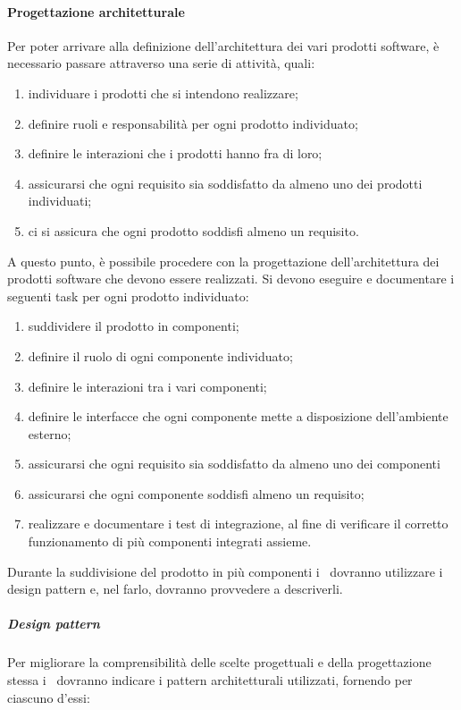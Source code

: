 \documentclass[../NormeProgetto.tex]{subfiles}
\begin{document}
		\paragraph{Progettazione architetturale}
			Per poter arrivare alla definizione dell'architettura dei vari prodotti software, è necessario passare attraverso una serie di attività, quali:
			\begin{enumerate}
				\item individuare i prodotti che si intendono realizzare;
				\item definire ruoli e responsabilità per ogni prodotto individuato;
				\item definire le interazioni che i prodotti hanno fra di loro;
				\item assicurarsi che ogni requisito sia soddisfatto da almeno uno dei prodotti individuati;
				\item ci si assicura che ogni prodotto soddisfi almeno un requisito.
			\end{enumerate}
			A questo punto, è possibile procedere con la progettazione dell'architettura dei prodotti software che devono essere realizzati. Si devono eseguire e documentare i seguenti task per ogni prodotto individuato:
			\begin{enumerate}
				\item suddividere il prodotto in componenti;
				\item definire il ruolo di ogni componente individuato;
				\item definire le interazioni tra i vari componenti;
				\item definire le interfacce che ogni componente mette a disposizione dell'ambiente esterno;
				\item assicurarsi che ogni requisito sia soddisfatto da almeno uno dei componenti
				\item assicurarsi che ogni componente soddisfi almeno un requisito;
				\item realizzare e documentare i test di integrazione, al fine di verificare il corretto funzionamento di più componenti integrati assieme.
			\end{enumerate}
			Durante la suddivisione del prodotto in più componenti i \progettisti\ dovranno utilizzare i design pattern e, nel farlo, dovranno provvedere a descriverli.
			\subparagraph{Design pattern}
				Per migliorare la comprensibilità delle scelte progettuali e della progettazione stessa i \progettisti\ dovranno indicare i pattern architetturali utilizzati, fornendo per ciascuno d'essi:
\end{document}
